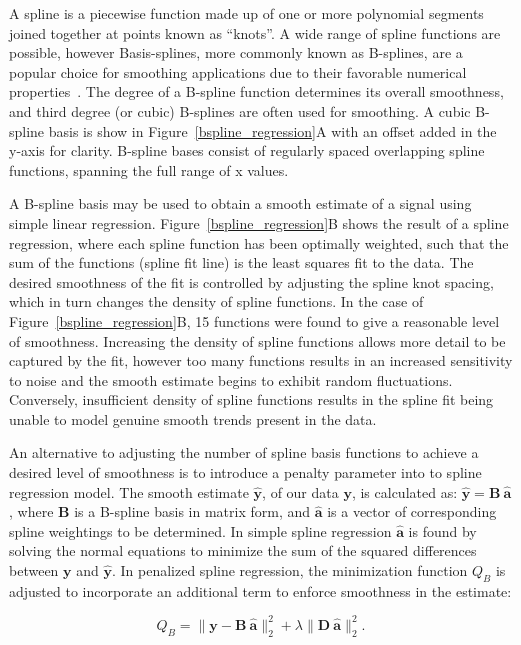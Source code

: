 \documentclass[num-refs]{wiley-article}
\begin{document}
A spline is a piecewise function made up of one or more polynomial segments joined together at points known as ``knots''. A wide range of spline functions are possible, however Basis-splines, more commonly known as B-splines, are a popular choice for smoothing applications due to their favorable numerical properties~\cite{DeBoor2001}. The degree of a B-spline function determines its overall smoothness, and third degree (or cubic) B-splines are often used for smoothing. A cubic B-spline basis is show in Figure~\ref{bspline_regression}A with an offset added in the y-axis for clarity. B-spline bases consist of regularly spaced overlapping spline functions, spanning the full range of x values.

A B-spline basis may be used to obtain a smooth estimate of a signal using simple linear regression. Figure~\ref{bspline_regression}B shows the result of a spline regression, where each spline function has been optimally weighted, such that the sum of the functions (spline fit line) is the least squares fit to the data. The desired smoothness of the fit is controlled by adjusting the spline knot spacing, which in turn changes the density of spline functions. In the case of Figure~\ref{bspline_regression}B, 15 functions were found to give a reasonable level of smoothness. Increasing the density of spline functions allows more detail to be captured by the fit, however too many functions results in an increased sensitivity to noise and the smooth estimate begins to exhibit random fluctuations. Conversely, insufficient density of spline functions results in the spline fit being unable to model genuine smooth trends present in the data.

An alternative to adjusting the number of spline basis functions to achieve a desired level of smoothness is to introduce a penalty parameter into to spline regression model. The smooth estimate $\hat{\mathbf{y}}$, of our data $\mathbf{y}$, is calculated as: $\hat{\mathbf{y}} = \mathbf{B} \ \hat{\mathbf{a}}$, where $\mathbf{B}$ is a B-spline basis in matrix form, and $\hat{\mathbf{a}}$ is a vector of corresponding spline weightings to be determined. In simple spline regression $\hat{\mathbf{a}}$ is found by solving the normal equations to minimize the sum of the squared differences between $\mathbf{y}$ and $\hat{\mathbf{y}}$. In penalized spline regression, the minimization function $Q_B$ is adjusted to incorporate an additional term to enforce smoothness in the estimate:

\begin{equation}
  Q_{B} = \|\mathbf{y} - \mathbf{B} \ \hat{\mathbf{a}} \|^{2}_{2} + \lambda \|\mathbf{D} \ \hat{\mathbf{a}}\|^{2}_{2}.
  \label{qb}
\end{equation}
\end{document}

